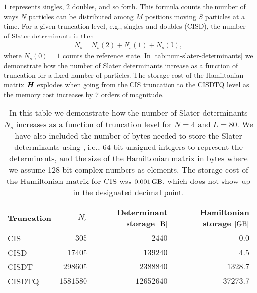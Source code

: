            $1$ represents singles, $2$ doubles, and so forth.
            This formula counts the number of ways $N$ particles can be
            distributed among $M$ positions moving $S$ particles at a time.
            For a given truncation level, e.g., singles-and-doubles (CISD), the
            number of Slater determinants is then
            \begin{align}
                N_s = N_s(2) + N_s(1) + N_s(0),
            \end{align}
            where $N_s(0) = 1$ counts the reference state.
            In \autoref{tab:num-slater-determinants} we demonstrate how the
            number of Slater determinants increase as a function of truncation
            for a fixed number of particles.
            The storage cost of the Hamiltonian matrix $\boldsymbol{H}$ explodes when
            going from the CIS truncation to the CISDTQ level as the memory cost
            increases by $7$ orders of magnitude.
            \begin{table}
                \centering
                \caption{In this table we demonstrate how the number of
                Slater determinants $N_s$ increases as a function of truncation
                level for $N = 4$ and $L = 80$.
                We have also included the number of bytes needed to store the
                Slater determinants using , i.e., 64-bit
                unsigned integers to represent the determinants, and the size of
                the Hamiltonian matrix in bytes where we assume 128-bit complex
                numbers as elements.
                The storage cost of the Hamiltonian matrix for CIS was
                $\SI{0.001}{\giga\byte}$, which does not show up in the
                designated decimal point.}
                \renewcommand{\arraystretch}{1.3}
                \begin{tabular}{@{}lrrr@{}}
                    \toprule
                    Truncation & $N_s$ & Determinant storage $[\si{\byte}]$
                    & Hamiltonian storage $[\si{\giga\byte}]$ \\
                    \midrule
                    CIS & $305$ & $2440$ & $0.0$ \\
                    CISD & $17405$ & $139240$ & $4.5$ \\
                    CISDT & $298605$ & $2388840$ & $1328.7$ \\
                    CISDTQ & $1581580$ & $12652640$ & $37273.7$ \\
                    \bottomrule
                \end{tabular}
                \label{tab:num-slater-determinants}
            \end{table}

